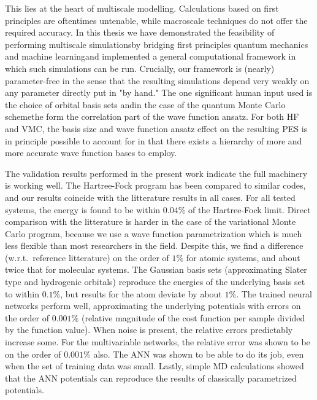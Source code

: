 \documentclass[twoside,english]{uiofysmaster}
\begin{document}
This lies at the heart of multiscale modelling. Calculations based on first principles are oftentimes untenable, while macroscale techniques do not offer the required accuracy.
In this thesis we have demonstrated the feasibility of performing multiscale simulations\textemdash by bridging first principles quantum mechanics and machine learning\textemdash and implemented a general computational framework in which such simulations can be run. Crucially, our framework is (nearly) parameter-free in the sense that the resulting simulations depend very weakly on any parameter directly put in "by hand." The one significant human input used is the choice of orbital basis sets and\textemdash in the case of the quantum Monte Carlo scheme\textemdash the form the correlation part of the wave function ansatz. For both HF and VMC, the basis size and wave function ansatz effect on the resulting PES is in principle possible to account for in that there exists a hierarchy of more and more accurate wave function bases to employ. 


The validation results performed in the present work indicate the full machinery is working well. The Hartree-Fock program has been compared to similar codes, and our results coincide with the litterature results in all cases. For all tested systems, the energy is found to be within $0.04\%$ of the Hartree-Fock limit. Direct comparison with the litterature is harder in the case of the variational Monte Carlo program, because we use a wave function parametrization which is much less flexible than most researchers in the field. Despite this, we find a difference (w.r.t.\ reference litterature) on the order of $1\%$ for atomic systems, and about twice that for molecular systems. The Gaussian basis sets (approximating Slater type and hydrogenic orbitals) reproduce the energies of the underlying basis set to within $0.1\%$, but results for the  atom deviate by about $1\%$. The trained neural networks perform well, approximating the underlying potentials with errors on the order of $0.001\%$ (relative magnitude of the cost function per sample divided by the function value). When noise is present, the relative errors predictably increase some. For the multivariable networks, the relative error was shown to be on the order of $0.001\%$ also. The ANN was shown to be able to do its job, even when the set of training data was small. Lastly, simple MD calculations showed that the ANN potentials can reproduce the results of classically parametrized potentials. 
\end{document}
